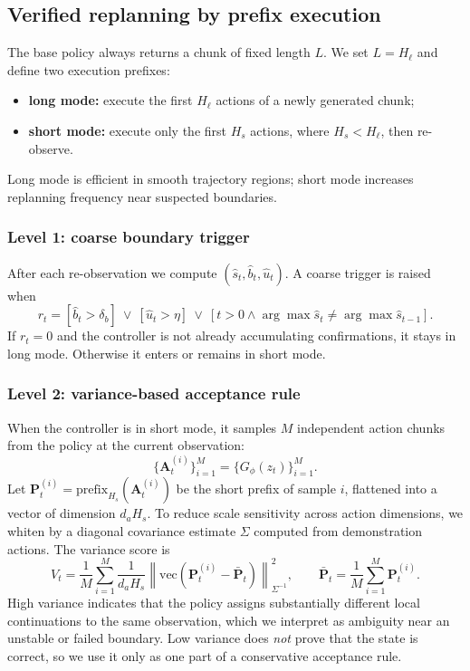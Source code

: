 \documentclass[10pt]{article}
\newcommand{\Hs}{H_s}
\newcommand{\Hl}{H_\ell}
\newcommand{\Msamples}{M}
\begin{document}
\subsection{Verified replanning by prefix execution}
\label{sec:inference}

The base policy always returns a chunk of fixed length $L$.
We set $L=\Hl$ and define two execution prefixes:
\begin{itemize}[leftmargin=1.5em, itemsep=0.15em]
  \item \textbf{long mode:} execute the first $\Hl$ actions of a newly generated
  chunk;
  \item \textbf{short mode:} execute only the first $\Hs$ actions, where
  $\Hs<\Hl$, then re-observe.
\end{itemize}
Long mode is efficient in smooth trajectory regions; short mode increases
replanning frequency near suspected boundaries.

\subsubsection{Level 1: coarse boundary trigger}

After each re-observation we compute $(\hat s_t,\hat b_t,\hat u_t)$.
A coarse trigger is raised when
\begin{equation}
  r_t = [\hat b_t > \delta_b]
  \ \vee\ [\hat u_t > \eta]
  \ \vee\ [t>0 \wedge \arg\max\hat s_t \neq \arg\max\hat s_{t-1}].
  \label{eq:trigger}
\end{equation}
If $r_t=0$ and the controller is not already accumulating confirmations, it
stays in long mode.
Otherwise it enters or remains in short mode.

\subsubsection{Level 2: variance-based acceptance rule}

When the controller is in short mode, it samples $\Msamples$ independent action
chunks from the policy at the current observation:
\[
  \{\mathbf{A}_t^{(i)}\}_{i=1}^{\Msamples}
  = \{G_\phi(z_t)\}_{i=1}^{\Msamples}.
\]
Let $\mathbf{P}_t^{(i)} = \mathrm{prefix}_{\Hs}(\mathbf{A}_t^{(i)})$ be the short
prefix of sample $i$, flattened into a vector of dimension $d_a\Hs$.
To reduce scale sensitivity across action dimensions, we whiten by a diagonal
covariance estimate $\Sigma$ computed from demonstration actions.
The variance score is
\begin{equation}
  V_t = \frac{1}{\Msamples}
  \sum_{i=1}^{\Msamples}
  \frac{1}{d_a\Hs}
  \left\|\mathrm{vec}(\mathbf{P}_t^{(i)}-\bar{\mathbf{P}}_t)\right\|_{\Sigma^{-1}}^2,
  \qquad
  \bar{\mathbf{P}}_t = \frac{1}{\Msamples}\sum_{i=1}^{\Msamples}\mathbf{P}_t^{(i)}.
  \label{eq:variance}
\end{equation}
High variance indicates that the policy assigns substantially different local
continuations to the same observation, which we interpret as ambiguity near an
unstable or failed boundary.
Low variance does \emph{not} prove that the state is correct, so we use it only
as one part of a conservative acceptance rule.
\end{document}
